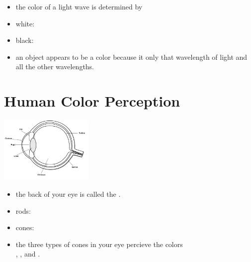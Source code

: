 \documentclass[11pt,landscape]{exam}
\begin{document}
\begin{multicols}{2}

  \begin{itemize}
    \item the color of a light wave is determined by  \vspace{0.5em}
    \item white: \vspace{2.5em}
    \item black: \vspace{2.5em}
    \item an object appears to be a color because it \fillin[reflects][12em] only that wavelength of light and \fillin[absorbs][12em] all the other wavelengths.
  \end{itemize}

  \vspace{7em}

  \begin{center}
  \end{center}


  \section*{Human Color Perception}

  \hfill \includegraphics[width=4.5cm]{eye} \hfill{}

  \begin{itemize}
    \item the back of your eye is called the \fillin[retina][8em]. \vspace{0.5em}
    \item rods: \vspace{2em}
    \item cones: \vspace{2em}
    \item the three types of cones in your eye percieve the colors \\\fillin[red][7em], \fillin[green][7em], and \fillin[blue][7em].
  \end{itemize}



\end{multicols}
\end{document}
